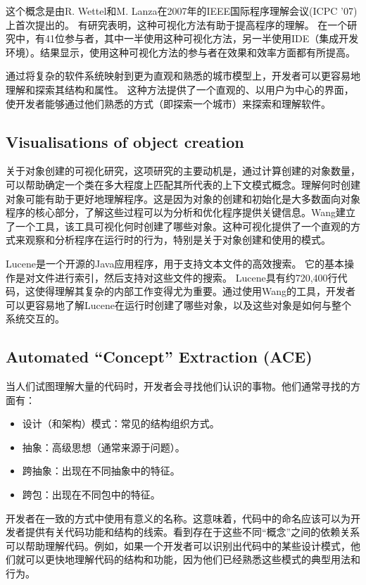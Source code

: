 这个概念是由R. Wettel和M. Lanza在2007年的IEEE国际程序理解会议(ICPC '07)上首次提出的。
有研究表明，这种可视化方法有助于提高程序的理解。
在一个研究中，有41位参与者，其中一半使用这种可视化方法，另一半使用IDE（集成开发环境）。结果显示，使用这种可视化方法的参与者在效果和效率方面都有所提高。

通过将复杂的软件系统映射到更为直观和熟悉的城市模型上，开发者可以更容易地理解和探索其结构和属性。
这种方法提供了一个直观的、以用户为中心的界面，使开发者能够通过他们熟悉的方式（即探索一个城市）来探索和理解软件。

\subsection{Visualisations of object creation}

关于对象创建的可视化研究，这项研究的主要动机是，通过计算创建的对象数量，可以帮助确定一个类在多大程度上匹配其所代表的上下文模式概念。理解何时创建对象可能有助于更好地理解程序。这是因为对象的创建和初始化是大多数面向对象程序的核心部分，了解这些过程可以为分析和优化程序提供关键信息。Wang建立了一个工具，该工具可视化何时创建了哪些对象。这种可视化提供了一个直观的方式来观察和分析程序在运行时的行为，特别是关于对象创建和使用的模式。

Lucene是一个开源的Java应用程序，用于支持文本文件的高效搜索。
它的基本操作是对文件进行索引，然后支持对这些文件的搜索。
Lucene具有约720,400行代码，这使得理解其复杂的内部工作变得尤为重要。通过使用Wang的工具，开发者可以更容易地了解Lucene在运行时创建了哪些对象，以及这些对象是如何与整个系统交互的。

\subsection{Automated “Concept” Extraction (ACE)}

当人们试图理解大量的代码时，开发者会寻找他们认识的事物。他们通常寻找的方面有：
\begin{itemize}
	\item 设计（和架构）模式：常见的结构组织方式。
	\item 抽象：高级思想（通常来源于问题）。
	\item 跨抽象：出现在不同抽象中的特征。
	\item 跨包：出现在不同包中的特征。
\end{itemize}

开发者在一致的方式中使用有意义的名称。这意味着，代码中的命名应该可以为开发者提供有关代码功能和结构的线索。看到存在于这些不同“概念”之间的依赖关系可以帮助理解代码。例如，如果一个开发者可以识别出代码中的某些设计模式，他们就可以更快地理解代码的结构和功能，因为他们已经熟悉这些模式的典型用法和行为。

